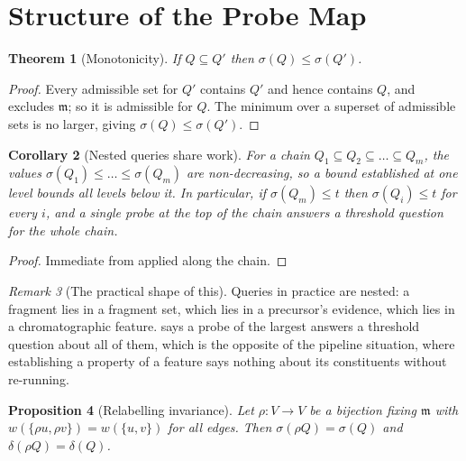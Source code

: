 \documentclass[11pt,a4paper]{article}
\newtheorem{theorem}{Theorem}[section]
\newtheorem{corollary}[theorem]{Corollary}
\newtheorem{proposition}[theorem]{Proposition}
\theoremstyle{definition}
\theoremstyle{remark}
\newtheorem{remark}[theorem]{Remark}
\newcommand{\wt}{w}
\newcommand{\med}{\mathfrak{m}}
\newcommand{\sep}{\sigma}
\newcommand{\dep}{\delta}
\begin{document}
\section{Structure of the Probe Map}
\label{sec:structure}

\begin{theorem}[Monotonicity]\label{thm:monotone}
If $Q \subseteq Q'$ then $\sep(Q) \leq \sep(Q')$.
\end{theorem}

\begin{proof}
Every admissible set for $Q'$ contains $Q'$ and hence contains $Q$, and
excludes $\med$; so it is admissible for $Q$. The minimum over a superset
of admissible sets is no larger, giving
$\sep(Q) \leq \sep(Q')$.
\end{proof}

\begin{corollary}[Nested queries share work]\label{cor:nested}
For a chain $Q_1 \subseteq Q_2 \subseteq \dots \subseteq Q_m$, the values
$\sep(Q_1) \leq \dots \leq \sep(Q_m)$ are non-decreasing, so a bound
established at one level bounds all levels below it. In particular, if
$\sep(Q_m) \leq t$ then $\sep(Q_i) \leq t$ for every $i$, and a single
probe at the top of the chain answers a threshold question for the whole
chain.
\end{corollary}

\begin{proof}
Immediate from  applied along the chain.
\end{proof}

\begin{remark}[The practical shape of this]\label{rem:nested}
Queries in practice are nested: a fragment lies in a fragment set, which
lies in a precursor's evidence, which lies in a chromatographic feature.
 says a probe of the largest answers a threshold
question about all of them, which is the opposite of the pipeline
situation, where establishing a property of a feature says nothing about
its constituents without re-running.
\end{remark}

\begin{proposition}[Relabelling invariance]\label{prop:relabel}
Let $\rho : V \to V$ be a bijection fixing $\med$ with
$\wt(\{\rho u,\rho v\}) = \wt(\{u,v\})$ for all edges. Then
$\sep(\rho Q) = \sep(Q)$ and $\dep(\rho Q) = \dep(Q)$.
\end{proposition}
\end{document}
